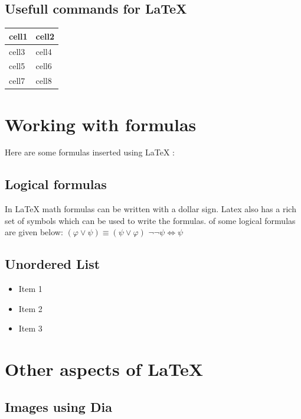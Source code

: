 \documentclass{report}
\begin{document}
\vspace{1mm}

\section{Usefull commands for LaTeX}

\begin{table} [h!]
\begin{tabular} { |l|l| } 
\hline
 cell1 & cell2 \\
 \hline
 cell3 & cell4 \\
 \hline
 cell5 & cell6 \\
 \hline
  cell7 & cell8 \\
 \hline
\end{tabular}

\end{table}

\chapter{Working with formulas}
Here are some formulas inserted using LaTeX :

\section{Logical formulas}
In LaTeX math formulas can be written with a dollar sign. Latex also has a rich set of symbols which can be used to write the formulas. of some logical formulas are given below:
$ ( \varphi \lor \psi ) \equiv ( \psi \lor \varphi ) $
$ \neg \neg \psi \Leftrightarrow \psi $



\section{Unordered List}
\begin{itemize}
\item Item 1
\item Item 2
\item Item 3
\end{itemize}

\chapter{Other aspects of LaTeX}


\section{Images using Dia}
\end{document}
